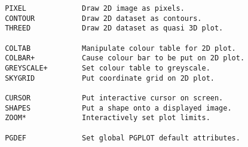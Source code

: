 \begin{verbatim}
 PIXEL             Draw 2D image as pixels.
 CONTOUR           Draw 2D dataset as contours.
 THREED            Draw 2D dataset as quasi 3D plot.

 COLTAB            Manipulate colour table for 2D plot.
 COLBAR+           Cause colour bar to be put on 2D plot.
 GREYSCALE+        Set colour table to greyscale.
 SKYGRID           Put coordinate grid on 2D plot.

 CURSOR            Put interactive cursor on screen.
 SHAPES            Put a shape onto a displayed image.
 ZOOM*             Interactively set plot limits.

 PGDEF             Set global PGPLOT default attributes.
\end{verbatim}
\normalsize

